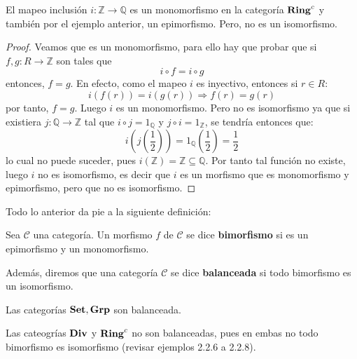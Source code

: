 \documentclass[12pt]{report}
\theoremstyle{largebreak}
\newcommand\cf[3]{\ensuremath{#1:#2\rightarrow#3}}
\newcommand{\Cat}[1]{\ensuremath{\textup{\textbf{#1}}}}
\begin{document}
    \begin{exa}
        El mapeo inclusión $\cf{i}{\mathbb{Z}}{\mathbb{Q}}$ es un monomorfismo en la categoría  $\Cat{Ring}^c$ y también por el ejemplo anterior, un epimorfismo. Pero, no es un isomorfismo.
    \end{exa}

    \begin{proof}
        Veamos que es un monomorfismo, para ello hay que probar que si $\cf{f,g}{R}{\mathbb{Z}}$ son tales que
        \begin{equation*}
            i\circ f=i\circ g
        \end{equation*}
        entonces, $f=g$. En efecto, como el mapeo $i$ es inyectivo, entonces si $r\in R$:
        \begin{equation*}
            i(f(r))=i(g(r))\Rightarrow f(r)=g(r)
        \end{equation*}
        por tanto, $f=g$. Luego $i$ es un monomorfismo. Pero no es isomorfismo ya que si existiera $\cf{j}{\mathbb{Q}}{\mathbb{Z}}$ tal que $i\circ j=1_{\mathbb{Q}}$ y $j\circ i=1_{\mathbb{Z}}$, se tendría entonces que:
        \begin{equation*}
            i(j(\frac{1}{2}))=1_{\mathbb{Q}}(\frac{1}{2})=\frac{1}{2}
        \end{equation*}
        lo cual no puede suceder, pues $i(\mathbb{Z})=\mathbb{Z}\subseteq\mathbb{Q}$. Por tanto tal función no existe, luego $i$ no es isomorfismo, es decir que $i$ es un morfismo que es monomorfismo y epimorfismo, pero que no es isomorfismo.

    \end{proof}

    Todo lo anterior da pie a la siguiente definición:

    \begin{mydef}
        Sea $\mathcal{C}$ una categoría. Un morfismo $f$ de $\mathcal{C}$ se dice \textbf{bimorfismo} si es un epimorfismo y un monomorfismo.

        Además, diremos que una categoría $\mathcal{C}$ se dice \textbf{balanceada} si todo bimorfismo es un isomorfismo.
    \end{mydef}

    \begin{exa}
        Las categorías $\Cat{Set},\Cat{Grp}$ son balanceada.
    \end{exa}

    \begin{exa}
        Las cateogrías $\Cat{Div}$ y $\Cat{Ring}^c$ no son balanceadas, pues en embas no todo bimorfismo es isomorfismo (revisar ejemplos 2.2.6 a 2.2.8).
    \end{exa}
\end{document}
